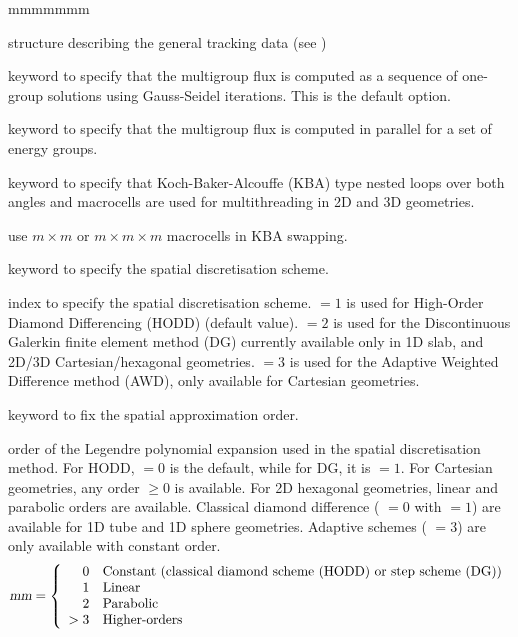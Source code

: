 \begin{ListeDeDescription}{mmmmmmm}

\item[\dstr{desctrack}] structure describing the general tracking data (see
)

\item[\moc{ONEG}] keyword to specify that the multigroup flux is computed as a sequence of one-group solutions using Gauss-Seidel iterations. This is the default option.

\item[\moc{ALLG}] keyword to specify that the multigroup flux is computed in parallel for a set of energy groups.

\item[\moc{KBA}] keyword to specify that Koch-Baker-Alcouffe (KBA) type nested loops over both angles and macrocells are used for
multithreading in 2D and 3D geometries.\cite{kba,domino}

\item[\dusa{m}] use $m\times m$ or $m \times m \times m$ macrocells in KBA swapping.

\item[\moc{SCHM}] keyword to specify the spatial discretisation scheme. 

\item[\dusa{ischm}] index to specify the spatial discretisation scheme.  $=1$ is used for High-Order Diamond Differencing (HODD) (default value).  $=2$ is used for the Discontinuous Galerkin finite element method (DG) currently available only in 1D slab, and 2D/3D Cartesian/hexagonal geometries.  $=3$ is used for the Adaptive Weighted Difference method (AWD), only available for Cartesian geometries.

\item[\moc{DIAM}] keyword to fix the spatial approximation order.

\item[\dusa{mm}] order of the Legendre polynomial expansion used in the spatial discretisation method. For HODD,  $=0$ is the default, while for DG, it is  $=1$.
For Cartesian geometries, any order  $\geq0$ is available. For 2D hexagonal geometries, linear and parabolic orders are available. Classical diamond difference ( $=0$ with  $=1$) are available for 1D tube and 1D sphere geometries. Adaptive schemes ( $=3$) are only available with constant order.
\begin{displaymath}
\dusa{mm} = \left\{
\begin{array}{rl}
 0 & \textrm{Constant (classical diamond scheme (HODD) or step scheme (DG))} \\
 1 & \textrm{Linear} \\
 2 & \textrm{Parabolic} \\
 >3  & \textrm{Higher-orders}
\end{array} \right.
\end{displaymath}


\end{ListeDeDescription}
